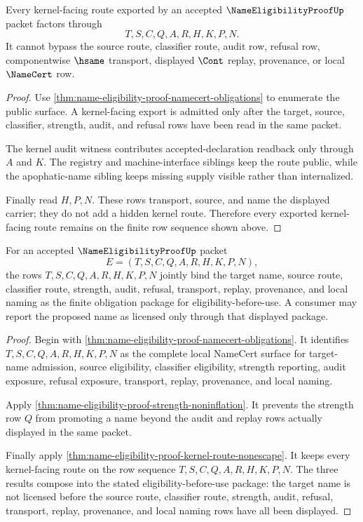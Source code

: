 \begin{theorem}
\label{thm:name-eligibility-proof-kernel-route-nonescape}
Every kernel-facing route exported by an accepted $\NameEligibilityProofUp$ packet factors through
$$
T,S,C,Q,A,R,H,K,P,N.
$$
It cannot bypass the source route, classifier route, audit row, refusal row, componentwise $\hsame$ transport, displayed $\Cont$ replay, provenance, or local $\NameCert$ row.
\end{theorem}
\begin{proof}
Use \autoref{thm:name-eligibility-proof-namecert-obligations} to enumerate the public surface. A kernel-facing export is admitted only after the target, source, classifier, strength, audit, and refusal rows have been read in the same packet.

The kernel audit witness contributes accepted-declaration readback only through $A$ and $K$. The registry and machine-interface siblings keep the route public, while the apophatic-name sibling keeps missing supply visible rather than internalized.

Finally read $H,P,N$. These rows transport, source, and name the displayed carrier; they do not add a hidden kernel route. Therefore every exported kernel-facing route remains on the finite row sequence shown above.
\end{proof}

\begin{theorem}
\label{thm:name-eligibility-proof-obligation-package}
For an accepted $\NameEligibilityProofUp$ packet
$$
E=(T,S,C,Q,A,R,H,K,P,N),
$$
the rows $T,S,C,Q,A,R,H,K,P,N$ jointly bind the target name, source route, classifier route, strength, audit, refusal, transport, replay, provenance, and local naming as the finite obligation package for eligibility-before-use. A consumer may report the proposed name as licensed only through that displayed package.
\end{theorem}
\begin{proof}
Begin with \autoref{thm:name-eligibility-proof-namecert-obligations}. It identifies $T,S,C,Q,A,R,H,K,P,N$ as the complete local NameCert surface for target-name admission, source eligibility, classifier eligibility, strength reporting, audit exposure, refusal exposure, transport, replay, provenance, and local naming.

Apply \autoref{thm:name-eligibility-proof-strength-noninflation}. It prevents the strength row $Q$ from promoting a name beyond the audit and replay rows actually displayed in the same packet.

Finally apply \autoref{thm:name-eligibility-proof-kernel-route-nonescape}. It keeps every kernel-facing route on the row sequence $T,S,C,Q,A,R,H,K,P,N$. The three results compose into the stated eligibility-before-use package: the target name is not licensed before the source route, classifier route, strength, audit, refusal, transport, replay, provenance, and local naming rows have all been displayed.
\end{proof}

